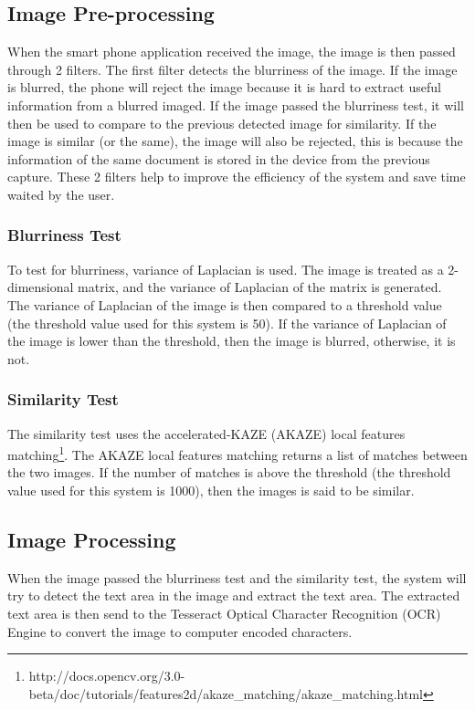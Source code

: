 \subsection{Image Pre-processing}
When the smart phone application received the image, the image is then passed through 2 filters. The first filter detects the blurriness of the image. If the image is blurred, the phone will reject the image because it is hard to extract useful information from a blurred imaged. If the image passed the blurriness test, it will then be used to compare to the previous detected image for similarity. If the image is similar (or the same), the image will also be rejected, this is because the information of the same document is stored in the device from the previous capture. These 2 filters help to improve the efficiency of the system and save time waited by the user.

\subsubsection{Blurriness Test}
To test for blurriness, variance of Laplacian is used. The image is treated as a 2-dimensional matrix, and the variance of Laplacian of the matrix is generated. The variance of Laplacian of the image is then compared to a threshold value (the threshold value used for this system is 50). If the variance of Laplacian of the image is lower than the threshold, then the image is blurred, otherwise, it is not.

\subsubsection{Similarity Test}
The similarity test uses the accelerated-KAZE (AKAZE) local features matching\footnote{http://docs.opencv.org/3.0-beta/doc/tutorials/features2d/akaze\_matching/akaze\_matching.html}. The AKAZE local features matching returns a list of matches between the two images. If the number of matches is above the threshold (the threshold value used for this system is 1000), then the images is said to be similar.

\subsection{Image Processing}
When the image passed the blurriness test and the similarity test, the system will try to detect the text area in the image and extract the text area. The extracted text area is then send to the Tesseract Optical Character Recognition (OCR) Engine to convert the image to computer encoded characters.


